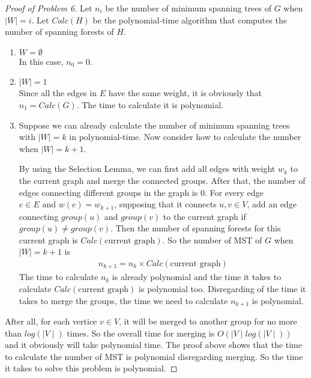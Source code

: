 \documentclass[paper=a4, fontsize=11pt]{scrartcl} %
\numberwithin{figure}{section} %
\numberwithin{table}{section} %
\begin{document}
		\begin{proof}[Proof of Problem 6]
		Let $n_i$ be the number of minimum spanning trees of $G$ when $\mid W \mid = i$. Let $Calc(H)$ be the polynomial-time algorithm that computes the number of spanning forests of $H$.
		\begin{enumerate}%
		\item $W = \emptyset$ \\ In this case, $n_0 = 0$.
		\item $\mid W \mid = 1$ \\ Since all the edges in $E$ have the same weight, it is obviously that $n_1 = Calc(G)$. The time to calculate it is polynomial.
		\item Suppose we can already calculate the number of minimum spanning trees with $\mid W \mid = k$ in polynomial-time. Now consider how to calculate the number when $\mid W \mid = k + 1$.
		
			By using the Selection Lemma, we can first add all edges with weight $w_k$ to the current graph and merge the connected groups. After that, the number of edges connecting different groups in the graph is $0$. For every edge $e \in E \textrm{ and } w(e) = w_{k+1}$, supposing that it connects $u, v \in V$, add an edge connecting $group(u)$ and $group(v)$ to the current graph if $group(u) \neq group(v)$. Then the number of spanning forests for this current graph is $Calc(\textrm{current graph})$. So the number of MST of $G$ when $\mid W \mid = k + 1$ is
			\begin{eqnarray}
				n_{k + 1} = n_k \times Calc(\textrm{current graph})
			\end{eqnarray}
			The time to calculate $n_k$ is already polynomial and the time it takes to calculate $Calc(\textrm{current graph})$ is polynomial too. Disregarding of the time it takes to merge the groups, the time we need to calculate $n_{k + 1}$ is polynomial.
		\end{enumerate}
		
		After all, for each vertice $v \in V$, it will be merged to another group for no more than $log(\mid V \mid)$ times. So the overall time for merging is $O(\mid V \mid log(\mid V \mid))$ and it obviously will take polynomial time. The proof above shows that the time to calculate the number of MST is polynomial disregarding merging. So the time it takes to solve this problem is polynomial.
	\end{proof}

\end{document}
